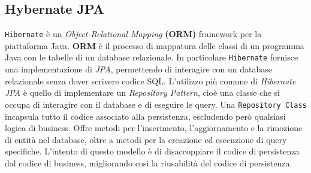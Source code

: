 \subsection{Hybernate JPA}
\label{subsec:hibernate_overview}
\texttt{Hibernate} è un \textit{Object-Relational Mapping} \textbf{(ORM)} framework per la piattaforma Java.
\textbf{ORM} è il processo di mappatura delle classi di un programma Java con le tabelle di un database relazionale.
In particolare \texttt{Hibernate} fornisce una implementazione di \textit{JPA}, permettendo di interagire con un database relazionale senza dover scrivere codice SQL.
L'utilizzo più comune di \textit{Hibernate JPA} è quello di implementare un \textit{Repository Pattern}, cioè una classe che si occupa di interagire con il database e di eseguire le query.
Una \texttt{Repository Class} incapsula tutto il codice associato alla persistenza, escludendo però qualsiasi logica di business. 
Offre metodi per l'inserimento, l'aggiornamento e la rimozione di entità nel database, oltre a metodi per la creazione ed esecuzione di query specifiche.
L'intento di questo modello è di disaccoppiare il codice di persistenza dal codice di business, migliorando così la riusabilità del codice di persistenza.
